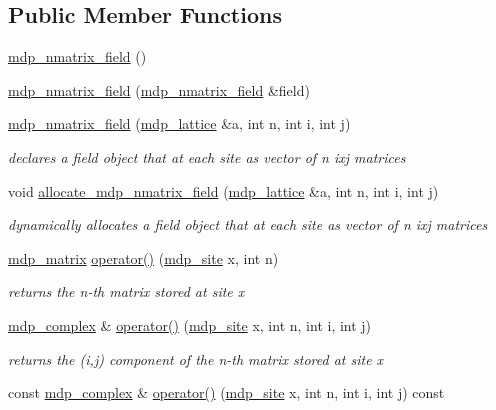 \subsection*{Public Member Functions}
\begin{DoxyCompactItemize}
\item 
\hyperlink{classmdp__nmatrix__field_a2431fcb07b72317d2bf87e46ddad80b1}{mdp\+\_\+nmatrix\+\_\+field} ()
\item 
\hyperlink{classmdp__nmatrix__field_a8a3db6bfa6ffc2a5679c24f3e297e0c4}{mdp\+\_\+nmatrix\+\_\+field} (\hyperlink{classmdp__nmatrix__field}{mdp\+\_\+nmatrix\+\_\+field} \&field)
\item 
\hyperlink{classmdp__nmatrix__field_a10d00272d103d471a1cd9e5921d39419}{mdp\+\_\+nmatrix\+\_\+field} (\hyperlink{classmdp__lattice}{mdp\+\_\+lattice} \&a, int n, int i, int j)
\begin{DoxyCompactList}\small\item\em declares a field object that at each site as vector of n ixj matrices \end{DoxyCompactList}\item 
void \hyperlink{classmdp__nmatrix__field_ad8803e7b0f9a755329a1d7335ac0c019}{allocate\+\_\+mdp\+\_\+nmatrix\+\_\+field} (\hyperlink{classmdp__lattice}{mdp\+\_\+lattice} \&a, int n, int i, int j)
\begin{DoxyCompactList}\small\item\em dynamically allocates a field object that at each site as vector of n ixj matrices \end{DoxyCompactList}\item 
\hyperlink{classmdp__matrix}{mdp\+\_\+matrix} \hyperlink{classmdp__nmatrix__field_a389126da9ddf86d42b27d4d9d20245f8}{operator()} (\hyperlink{classmdp__site}{mdp\+\_\+site} x, int n)
\begin{DoxyCompactList}\small\item\em returns the n-\/th matrix stored at site x \end{DoxyCompactList}\item 
\hyperlink{classmdp__complex}{mdp\+\_\+complex} \& \hyperlink{classmdp__nmatrix__field_ab166e6abe76fcafd63dec9739da8324c}{operator()} (\hyperlink{classmdp__site}{mdp\+\_\+site} x, int n, int i, int j)
\begin{DoxyCompactList}\small\item\em returns the (i,j) component of the n-\/th matrix stored at site x \end{DoxyCompactList}\item 
const \hyperlink{classmdp__complex}{mdp\+\_\+complex} \& \hyperlink{classmdp__nmatrix__field_a0bb8a411d6ce8499e643fd68d4f56294}{operator()} (\hyperlink{classmdp__site}{mdp\+\_\+site} x, int n, int i, int j) const
\end{DoxyCompactItemize}
